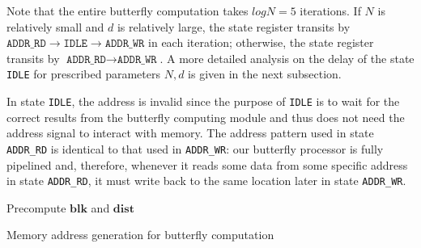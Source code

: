 \documentclass{iacrtrans}
\theoremstyle{plain}
\begin{document}
Note that the entire butterfly computation takes $logN=5$ iterations. If $N$ is relatively small and $d$ is relatively large, the state register transits by $\texttt{ADDR\_RD}\to \texttt{IDLE}\to \texttt{ADDR\_WR}$ in each iteration; otherwise, the state register transits by $\texttt{ADDR\_RD}\to \texttt{ADDR\_WR}$. A more detailed analysis on the delay of the state \texttt{IDLE} for prescribed parameters $N,d$ is given in the next subsection.

In state \texttt{IDLE}, the address is invalid since the purpose of \texttt{IDLE} is to wait for the correct results from the butterfly computing module and thus does not need the address signal to interact with memory. The address pattern used in state \texttt{ADDR\_RD} is identical to that used in \texttt{ADDR\_WR}: our butterfly processor is fully pipelined and, therefore, whenever it reads some data from some specific address in state \texttt{ADDR\_RD}, it must write back to the same location later in state \texttt{ADDR\_WR}.

\begin{algorithm}[!tbh]
 \DontPrintSemicolon %
    Precompute $\mathbf{blk}$ and $\mathbf{dist}$\;
    
 \caption{Memory address generation for butterfly computation}\label{alg:addrgen}
\end{algorithm}
\end{document}
